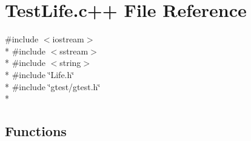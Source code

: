 \hypertarget{TestLife_8c_09_09}{\section{Test\-Life.\-c++ File Reference}
\label{TestLife_8c_09_09}
}
{\ttfamily \#include $<$iostream$>$}\\*
{\ttfamily \#include $<$sstream$>$}\\*
{\ttfamily \#include $<$string$>$}\\*
{\ttfamily \#include \char`\"{}Life.\-h\char`\"{}}\\*
{\ttfamily \#include \char`\"{}gtest/gtest.\-h\char`\"{}}\\*
\subsection*{Functions}
